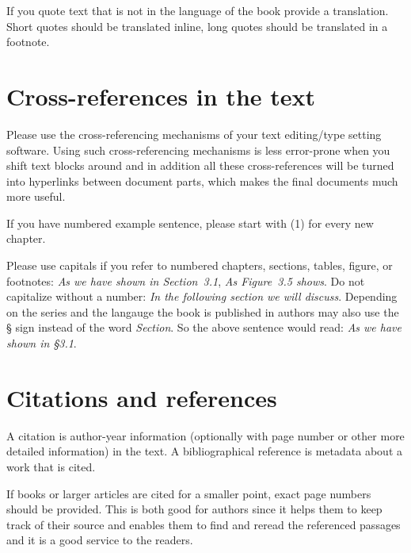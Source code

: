 If you quote text that is not in the language of the book provide a translation. Short quotes should
be translated inline, long quotes should be translated in a footnote.

\section{Cross-references in the text}

Please use the cross-referencing mechanisms of your text editing/type setting software. Using such
cross-referencing mechanisms is less error-prone when you shift text blocks around and in addition
all these cross-references will be turned into hyperlinks between document parts, which makes the
final documents much more useful.

If you have numbered example sentence, please start with (1) for every new chapter.

Please use capitals if you refer to numbered chapters, sections, tables, figure, or footnotes: \emph{As we have shown in
  Section~3.1}, \emph{As Figure~3.5 shows}. Do not capitalize without a number: \emph{In the
  following section we will discuss}.
Depending on the series and the langauge the book is published in authors may also use the § sign
instead of the word \emph{Section}. So the above sentence would read: \emph{As we have shown in
  §3.1}.

\section{Citations and references}
\label{sec-references-authors}

A citation is author-year information (optionally with page number or other more detailed information) in the text. A bibliographical reference is metadata about a work that is cited.

If books or larger articles are cited for a smaller point, exact page numbers should be provided. This is both good for
authors since it helps them to keep track of their source and enables them to find and reread the
referenced passages and it is a good service to the readers.


